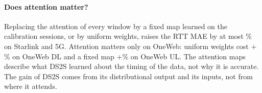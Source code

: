 \paragraph{Does attention matter?} Replacing the attention of every window by a fixed map learned on the calibration sessions, or by uniform weights, raises the RTT MAE by at most \AttnAblMax\% on Starlink and 5G. Attention matters only on OneWeb: uniform weights cost $+$\AttnAblOWDL\% on OneWeb DL and a fixed map $+$\AttnAblOWULmap\% on OneWeb UL. The attention maps describe what DS2S learned about the timing of the data, not why it is accurate. The gain of DS2S comes from its distributional output and its inputs, not from where it attends.
